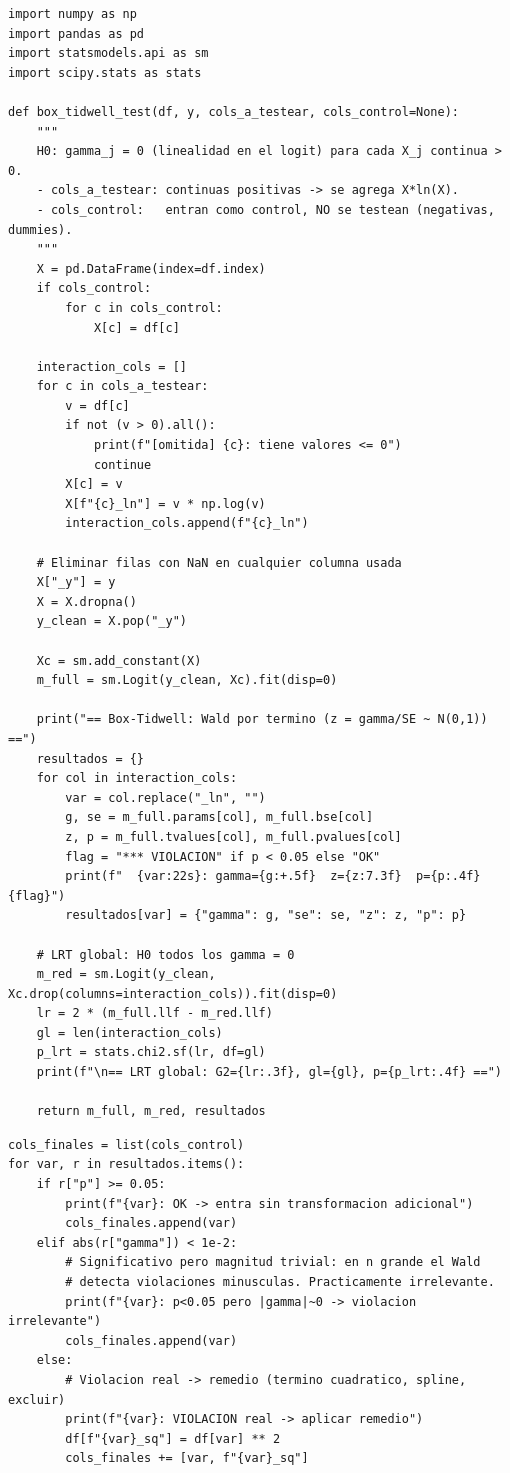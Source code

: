 \documentclass[11pt]{article}
\theoremstyle{plain}
\theoremstyle{definition}
\theoremstyle{remark}
\begin{document}
\begin{lstlisting}[style=py, caption={Box--Tidwell conjunto con Wald por término y LRT global.}]
import numpy as np
import pandas as pd
import statsmodels.api as sm
import scipy.stats as stats

def box_tidwell_test(df, y, cols_a_testear, cols_control=None):
    """
    H0: gamma_j = 0 (linealidad en el logit) para cada X_j continua > 0.
    - cols_a_testear: continuas positivas -> se agrega X*ln(X).
    - cols_control:   entran como control, NO se testean (negativas, dummies).
    """
    X = pd.DataFrame(index=df.index)
    if cols_control:
        for c in cols_control:
            X[c] = df[c]

    interaction_cols = []
    for c in cols_a_testear:
        v = df[c]
        if not (v > 0).all():
            print(f"[omitida] {c}: tiene valores <= 0")
            continue
        X[c] = v
        X[f"{c}_ln"] = v * np.log(v)
        interaction_cols.append(f"{c}_ln")

    # Eliminar filas con NaN en cualquier columna usada
    X["_y"] = y
    X = X.dropna()
    y_clean = X.pop("_y")

    Xc = sm.add_constant(X)
    m_full = sm.Logit(y_clean, Xc).fit(disp=0)

    print("== Box-Tidwell: Wald por termino (z = gamma/SE ~ N(0,1)) ==")
    resultados = {}
    for col in interaction_cols:
        var = col.replace("_ln", "")
        g, se = m_full.params[col], m_full.bse[col]
        z, p = m_full.tvalues[col], m_full.pvalues[col]
        flag = "*** VIOLACION" if p < 0.05 else "OK"
        print(f"  {var:22s}: gamma={g:+.5f}  z={z:7.3f}  p={p:.4f}  {flag}")
        resultados[var] = {"gamma": g, "se": se, "z": z, "p": p}

    # LRT global: H0 todos los gamma = 0
    m_red = sm.Logit(y_clean, Xc.drop(columns=interaction_cols)).fit(disp=0)
    lr = 2 * (m_full.llf - m_red.llf)
    gl = len(interaction_cols)
    p_lrt = stats.chi2.sf(lr, df=gl)
    print(f"\n== LRT global: G2={lr:.3f}, gl={gl}, p={p_lrt:.4f} ==")

    return m_full, m_red, resultados
\end{lstlisting}

\begin{lstlisting}[style=py, caption={Decisión post-test con criterio de magnitud (clave en $n$ grande).}]
cols_finales = list(cols_control)
for var, r in resultados.items():
    if r["p"] >= 0.05:
        print(f"{var}: OK -> entra sin transformacion adicional")
        cols_finales.append(var)
    elif abs(r["gamma"]) < 1e-2:
        # Significativo pero magnitud trivial: en n grande el Wald
        # detecta violaciones minusculas. Practicamente irrelevante.
        print(f"{var}: p<0.05 pero |gamma|~0 -> violacion irrelevante")
        cols_finales.append(var)
    else:
        # Violacion real -> remedio (termino cuadratico, spline, excluir)
        print(f"{var}: VIOLACION real -> aplicar remedio")
        df[f"{var}_sq"] = df[var] ** 2
        cols_finales += [var, f"{var}_sq"]
\end{lstlisting}
\end{document}
